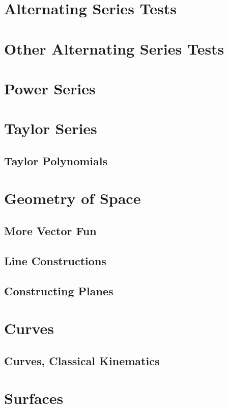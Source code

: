 
\section{Alternating Series Tests}

\section{Other Alternating Series Tests}

\section{Power Series}

\section{Taylor Series}

\subsection{Taylor Polynomials}

\section{Geometry of Space}

\subsection{More Vector Fun}

\subsection{Line Constructions}

\subsection{Constructing Planes}

\section{Curves}
\subsection{Curves, Classical Kinematics}


\section{Surfaces}

